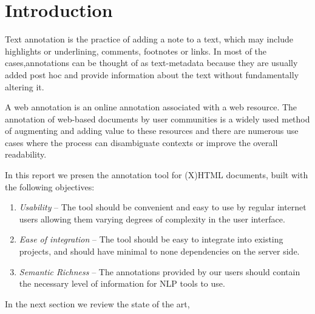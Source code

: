 \section{Introduction}\label{sec:intro}
Text annotation is the practice of adding a note to a text, which may include highlights
or underlining, comments, footnotes or links.  In most of the cases,annotations can be
thought of as text-metadata because they are usually added post hoc and provide
information about the text without fundamentally altering it.

A web annotation is an online annotation associated with a web resource. The annotation of
web-based documents by user communities is a widely used method of augmenting and adding
value to these resources and there are numerous use cases where the process can
disambiguate contexts or improve the overall readability.

In this report we presen the \KAT annotation tool for (X)HTML documents, built with the
following objectives:
\begin{enumerate}
\item \emph{Usability} -- The tool should be convenient and easy to use by regular
  internet users allowing them varying degrees of complexity in the user interface.
\item \emph{Ease of integration} -- The tool should be easy to integrate into existing
  projects, and should have minimal to none dependencies on the server side.
\item \emph{Semantic Richness} -- The annotations provided by our users should contain the
  necessary level of information for NLP tools to use.
\end{enumerate}
In the next section we review the state of the art, 


